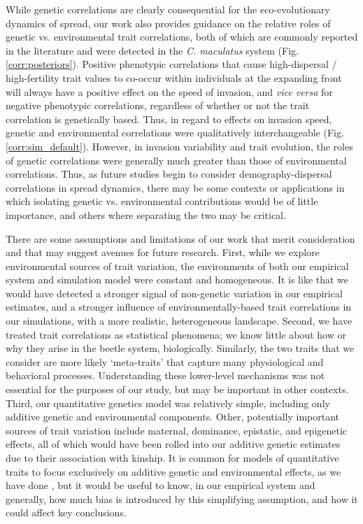 \documentclass[11pt]{article}
\begin{document}
While genetic correlations are clearly consequential for the eco-evolutionary dynamics of spread, our work also provides guidance on the relative roles of genetic vs. environmental trait correlations, both of which are commonly reported in the literature and were detected in the \textit{C. maculatus} system (Fig. \ref{corr:posteriors}).
Positive phenotypic correlations that cause high-dispersal / high-fertility trait values to co-occur within individuals at the expanding front will always have a positive effect on the speed of invasion, and \textit{vice versa} for negative phenotypic correlations, regardless of whether or not the trait correlation is genetically based.
Thus, in regard to effects on invasion speed, genetic and environmental correlations were qualitatively interchangeable (Fig. \ref{corr:sim_default}).
However, in invasion variability and trait evolution, the roles of genetic correlations were generally much greater than those of environmental correlations.
Thus, as future studies begin to consider demography-dispersal correlations in spread dynamics, there may be some contexts or applications in which isolating genetic vs. environmental contributions would be of little importance, and others where separating the two may be critical. 

There are some assumptions and limitations of our work that merit consideration and that may suggest avenues for future research.
First, while we explore environmental sources of trait variation, the environments of both our empirical system and simulation model were constant and homogeneous. 
It is like that we would have detected a stronger signal of non-genetic variation in our empirical estimates, and  a stronger influence of environmentally-based trait correlations in our simulations, with a more realistic, heterogeneous landscape. 
Second, we have treated trait correlations as statistical phenomena; we know little about how or why they arise in the beetle system, biologically.
Similarly, the two traits that we consider are more likely `meta-traits' that capture many physiological and behavioral processes.
Understanding these lower-level mechanisms was not essential for the purposes of our study, but may be important in other contexts. 
Third, our quantitative genetics model was relatively simple, including only additive genetic and environmental components. 
Other, potentially important sources of trait variation include maternal, dominance, epistatic, and epigenetic effects, all of which would have been rolled into our additive genetic estimates due to their association with kinship.
It is common for models of quantitative traits to focus exclusively on additive genetic and environmental effects, as we have done \citep{wilson_ecologists_2010}, but it would be useful to know, in our empirical system and generally, how much bias is introduced by this simplifying assumption, and how it could affect key conclusions. 
\end{document}
